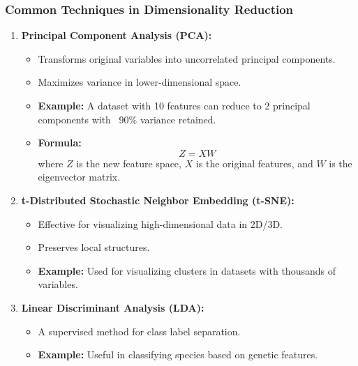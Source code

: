 \documentclass[aspectratio=169]{beamer}
\begin{document}
\begin{frame}[fragile]
    \frametitle{Common Techniques in Dimensionality Reduction}
    \begin{enumerate}
        \item \textbf{Principal Component Analysis (PCA):}
            \begin{itemize}
                \item Transforms original variables into uncorrelated principal components.
                \item Maximizes variance in lower-dimensional space.
                \item \textbf{Example:} A dataset with 10 features can reduce to 2 principal components with ~90\% variance retained.
                \item \textbf{Formula:}
                \begin{equation}
                    Z = XW
                \end{equation}
                where \( Z \) is the new feature space, \( X \) is the original features, and \( W \) is the eigenvector matrix.
            \end{itemize}
        \item \textbf{t-Distributed Stochastic Neighbor Embedding (t-SNE):}
            \begin{itemize}
                \item Effective for visualizing high-dimensional data in 2D/3D.
                \item Preserves local structures.
                \item \textbf{Example:} Used for visualizing clusters in datasets with thousands of variables.
            \end{itemize}
        \item \textbf{Linear Discriminant Analysis (LDA):}
            \begin{itemize}
                \item A supervised method for class label separation.
                \item \textbf{Example:} Useful in classifying species based on genetic features.
            \end{itemize}
    \end{enumerate}
\end{frame}
\end{document}
